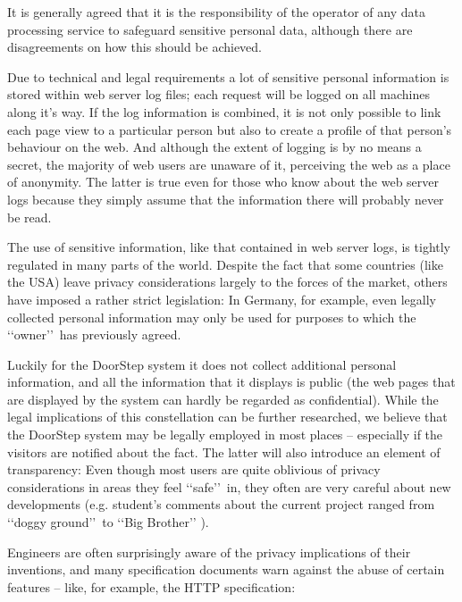 \documentclass[a4paper]{danarticle}
\theoremstyle{remark}
\begin{document}
    It is generally agreed that it is the 
    responsibility of the operator of any data processing service to safeguard 
    sensitive personal data, although there are disagreements on how this should
    be achieved.
    
    Due to technical and legal requirements a lot of sensitive personal 
    information is stored within web server log files; each request will be 
    logged on all machines along it's way. If the log information is 
    combined, it is not only possible to link each page view to a particular 
    person but also to create a profile of that person's behaviour on the web. 
    And although the extent of logging is by no means a secret, the majority 
    of web users are unaware of it, perceiving the web as a place of anonymity.
    The latter is true even for those who know about the web server logs because
    they simply assume that the information there will probably never be read.
    
    The use of sensitive information, like that contained in web server logs,
    is tightly regulated in many parts of the world. Despite the fact 
    that some countries (like the USA) leave privacy considerations largely to 
    the forces of the market, others have imposed a rather strict legislation: 
    In Germany, for example, even legally collected personal information may 
    only be used for purposes to which the \lq\lq owner\rq\rq\ has previously
    agreed. 
    
    Luckily for the DoorStep system it does not collect additional personal
    information, and all the information that it displays is public 
    (the web pages that are displayed by the system can hardly be 
    regarded as confidential). While the legal implications of this
    constellation can be further researched, we believe that the DoorStep system
    may be legally employed in most places -- especially if the visitors are
    notified about the fact. The latter will also introduce an element of
    transparency:  Even though most users are quite oblivious of privacy 
    considerations in areas they feel \lq\lq safe\rq\rq\ in, they often are very 
    careful about new developments (e.g. student's comments about the current 
    project ranged from \lq\lq doggy ground\rq\rq\ to \lq\lq Big Brother\rq\rq 
    ).
    
    Engineers are often surprisingly aware of the privacy implications of their 
    inventions, and many specification documents warn against the abuse of 
    certain features -- like, for example, the HTTP specification\cite{http}:
    
\end{document}
